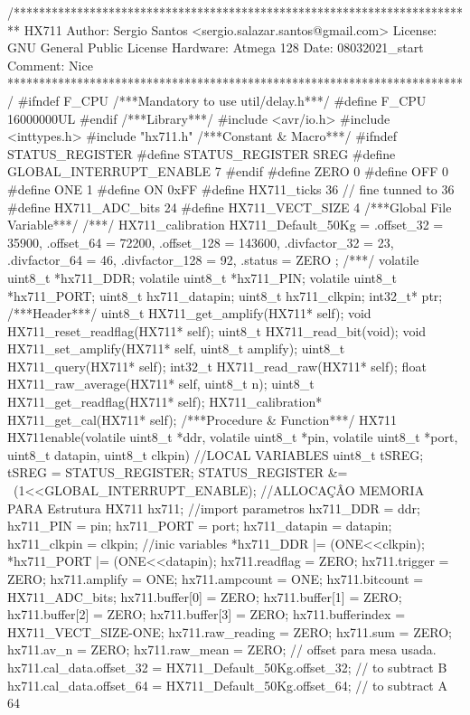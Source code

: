 \begin{verbatimtab}
/*************************************************************************
HX711
Author: Sergio Santos
<sergio.salazar.santos@gmail.com>
License: GNU General Public License     
Hardware: Atmega 128
Date: 08032021_start
Comment:
Nice
************************************************************************/
#ifndef F_CPU
/***Mandatory to use util/delay.h***/
#define F_CPU 16000000UL
#endif
/***Library***/
#include <avr/io.h>
#include <inttypes.h>
#include "hx711.h"
/***Constant & Macro***/
#ifndef STATUS_REGISTER
#define STATUS_REGISTER SREG
#define GLOBAL_INTERRUPT_ENABLE 7
#endif
#define ZERO 0
#define OFF 0
#define ONE 1
#define ON 0xFF
#define HX711_ticks 36 // fine tunned to 36
#define HX711_ADC_bits 24
#define HX711_VECT_SIZE 4
/***Global File Variable***/
/***/
HX711_calibration HX711_Default_50Kg = {
	.offset_32 = 35900,
	.offset_64 = 72200,
	.offset_128 = 143600,
	.divfactor_32 = 23,
	.divfactor_64 = 46,
	.divfactor_128 = 92,
	.status = ZERO
};
/***/
volatile uint8_t *hx711_DDR;
volatile uint8_t *hx711_PIN;
volatile uint8_t *hx711_PORT;
uint8_t hx711_datapin;
uint8_t hx711_clkpin;
int32_t* ptr;
/***Header***/
uint8_t HX711_get_amplify(HX711* self);
void HX711_reset_readflag(HX711* self);
uint8_t HX711_read_bit(void);
void HX711_set_amplify(HX711* self, uint8_t amplify);
uint8_t HX711_query(HX711* self);
int32_t HX711_read_raw(HX711* self);
float HX711_raw_average(HX711* self, uint8_t n);
uint8_t HX711_get_readflag(HX711* self);
HX711_calibration* HX711_get_cal(HX711* self);
/***Procedure & Function***/
HX711 HX711enable(volatile uint8_t *ddr, volatile uint8_t *pin, volatile uint8_t *port, 
uint8_t datapin, uint8_t clkpin)
{
	//LOCAL VARIABLES
	uint8_t tSREG;
	tSREG = STATUS_REGISTER;
	STATUS_REGISTER &= ~(1<<GLOBAL_INTERRUPT_ENABLE);
	//ALLOCAÇÂO MEMORIA PARA Estrutura
	HX711 hx711;
	//import parametros
	hx711_DDR = ddr;
	hx711_PIN = pin;
	hx711_PORT = port;
	hx711_datapin = datapin;
	hx711_clkpin = clkpin;
	//inic variables
	*hx711_DDR |= (ONE<<clkpin);
	*hx711_PORT |= (ONE<<datapin);
	hx711.readflag = ZERO;
	hx711.trigger = ZERO;
	hx711.amplify = ONE;
	hx711.ampcount = ONE;
	hx711.bitcount = HX711_ADC_bits;
	hx711.buffer[0] = ZERO;
	hx711.buffer[1] = ZERO;
	hx711.buffer[2] = ZERO;
	hx711.buffer[3] = ZERO;
	hx711.bufferindex = HX711_VECT_SIZE-ONE;
	hx711.raw_reading = ZERO;
	hx711.sum = ZERO;
	hx711.av_n = ZERO;
	hx711.raw_mean = ZERO;
	// offset para mesa usada.
	hx711.cal_data.offset_32 = HX711_Default_50Kg.offset_32; // to subtract B
	hx711.cal_data.offset_64 = HX711_Default_50Kg.offset_64; // to subtract A 64
}
\end{verbatimtab}
